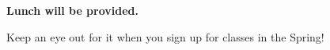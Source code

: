 \textbf{Lunch will be provided.}

Keep an eye out for it when you sign up for classes in the Spring!
 

